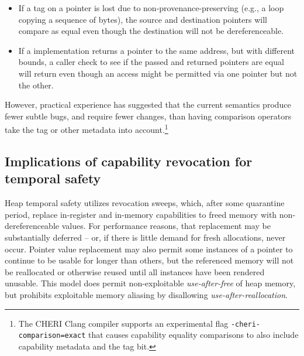 \documentclass[12pt,twoside,openright,usletter]{article}
\newcommand{\ccode}[1]{{\small\ttfamily{#1}}}
\newcommand{\cfunc}[1]{{\ccode{#1()}}}
\newcommand{\note}[2]{{\color{blue}[ Note: #1 - #2]}}
\renewcommand{\note}[2]{\relax\ifhmode\unskip\fi}
\newcommand{\arnote}[1]{\note{#1}{Alex R.}}
\newcommand{\psnote}[1]{\note{#1}{Peter S.}}
\begin{document}
\begin{itemize}
\item If a tag on a pointer is lost due to non-provenance-preserving
  \cfunc{memcpy} (e.g., a \ccode{for} loop copying a sequence of bytes), the
  source and destination pointers will compare as equal even though the
  destination will not be dereferenceable.

\item If a \cfunc{realloc} implementation returns a pointer to the same
  address, but with different bounds, a caller check to see if the passed and
  returned pointers are equal will return \ccode{true} even though an access
  might be permitted via one pointer but not the other.
\end{itemize}

\psnote{I'm curious about the impact on compiler optimisation, where in the scope of \texttt{if (p==q)} compilers will often assume the two are interchangeable.  Comment on that?
 }
 \arnote{The choice between exact vs non-exact equals is made extremely late in code generation, it just chooses between emitting CEq and CExEq.
 Compiler analyses use a stricter definition of equality.
 In clang that should include some cases of taking provenance into account for alias information.}

\noindent
However, practical experience has suggested that the current semantics produce fewer
subtle bugs, and require fewer changes, than having comparison operators take
the tag or other metadata into account.\footnote{
The CHERI Clang compiler supports an experimental flag \texttt{-cheri-comparison=exact} that causes capability equality comparisons to also include capability metadata and the tag bit.
\arnote{default behaviour=\texttt{-cheri-comparison=address}}
}

\subsection{Implications of capability revocation for temporal safety}

Heap temporal safety utilizes revocation sweeps, which, after some quarantine
period, replace in-register and in-memory capabilities to freed memory with
non-dereferenceable values.
For performance reasons, that replacement may be substantially deferred -- or,
if there is little demand for fresh allocations, never occur.
Pointer value replacement may also permit some instances of
a pointer to continue to be usable for longer than others, but the referenced
memory will not be reallocated or otherwise reused until all instances have been rendered unusable.
This model does permit non-exploitable \textit{use-after-free} of heap memory,
but prohibits exploitable memory aliasing by disallowing \textit{use-after-reallocation}.
\end{document}
